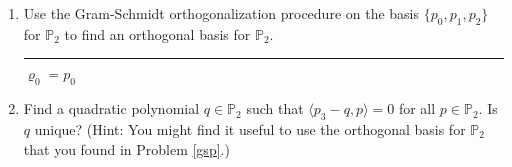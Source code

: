 \documentclass[12pt]{amsart}
\newcommand{\1}{\mathbbm{1}}
\numberwithin{equation}{section}
\numberwithin{Theorem}{section}
\theoremstyle{plain} %
\theoremstyle{definition}
\theoremstyle{remark}
\begin{document}
\begin{enumerate}[1.]
\begin{enumerate}[(a)]
\begin{proof}
		\begin{align*}
			c_1\mathbf{e}_1+c_2\mathbf{e}_2
			&= c_1\mathbf{v}_1+c_2\left( \mathbf{v}_2 - \frac{\langle\mathbf{e}_1,\mathbf{v}_2\rangle}{\|\mathbf{e}_1\|^2}\mathbf{e}_1 \right) \\
			&= c_1\mathbf{v}_1- c_2\left( \frac{\langle\mathbf{e}_1,\mathbf{v}_2\rangle}{\|\mathbf{e}_1\|^2}\mathbf{e}_1 \right) + c_2\mathbf{v}_2 \\
			&= c_1\mathbf{v}_1- c_2\left( \frac{\langle\mathbf{e}_1,\mathbf{v}_2\rangle}{\|\mathbf{e}_1\|^2}\mathbf{e}_1 \right) + c_2\mathbf{v}_2 \\
			&= c_1\mathbf{v}_1- c_2\left( \frac{\langle\mathbf{e}_1,\mathbf{v}_2\rangle}{\|\mathbf{e}_1\|^2}\mathbf{v}_1 \right) + c_2\mathbf{v}_2 \\
			&= \left(c_1- c_2 \frac{\langle\mathbf{e}_1,\mathbf{v}_2\rangle}{\|\mathbf{e}_1\|^2} \right)\mathbf{v}_1 + c_2\mathbf{v}_2.
		\end{align*}
		Thus \(\operatorname{span}\{\mathbf{e}_{1},\mathbf{e}_{2}\} \subseteq \operatorname{span}\{\mathbf{v}_{1},\mathbf{v}_{2}\}\). Because each span is a subset of the other we can conclude \(\operatorname{span}\{\mathbf{e}_{1},\mathbf{e}_{2}\} = \operatorname{span}\{\mathbf{v}_{1},\mathbf{v}_{2}\}\).
	\end{proof}
	

\end{enumerate}



\item\label{gsp} Use the Gram-Schmidt orthogonalization procedure on the basis \(\{p_{0},p_{1},p_{2}\}\) for \(\mathbb{P}_{2}\) to find an orthogonal basis for \(\mathbb{P}_{2}\).\bigskip

\hrule
\bigskip



\(\varrho_0=p_0\)


\item Find a quadratic polynomial \(q\in\mathbb{P}_{2}\) such that \(\langle p_{3}-q,p\rangle = 0\) for all \(p\in\mathbb{P}_{2}\). Is \(q\) unique? (Hint: You might find it useful to use the orthogonal basis for \(\mathbb{P}_{2}\) that you found in Problem \ref{gsp}.) \bigskip


\end{enumerate}
\end{document}
